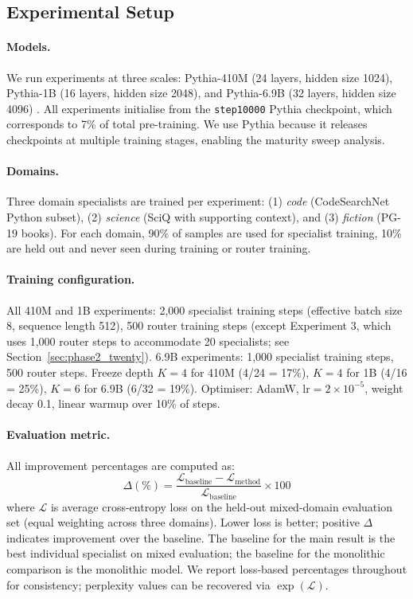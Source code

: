 \documentclass{article}
\begin{document}
\subsection{Experimental Setup}
\label{sec:setup}

\paragraph{Models.} We run experiments at three scales: Pythia-410M (24 layers, hidden size 1024), Pythia-1B (16 layers, hidden size 2048), and Pythia-6.9B (32 layers, hidden size 4096) \citep{biderman2023pythia}. All experiments initialise from the \texttt{step10000} Pythia checkpoint, which corresponds to 7\% of total pre-training. We use Pythia because it releases checkpoints at multiple training stages, enabling the maturity sweep analysis.

\paragraph{Domains.} Three domain specialists are trained per experiment: (1) \emph{code} (CodeSearchNet Python subset), (2) \emph{science} (SciQ with supporting context), and (3) \emph{fiction} (PG-19 books). For each domain, 90\% of samples are used for specialist training, 10\% are held out and never seen during training or router training.

\paragraph{Training configuration.} All 410M and 1B experiments: 2,000 specialist training steps (effective batch size 8, sequence length 512), 500 router training steps (except Experiment 3, which uses 1,000 router steps to accommodate 20 specialists; see Section~\ref{sec:phase2_twenty}). 6.9B experiments: 1,000 specialist training steps, 500 router steps. Freeze depth $K=4$ for 410M (4/24 = 17\%), $K=4$ for 1B (4/16 = 25\%), $K=6$ for 6.9B (6/32 = 19\%). Optimiser: AdamW, $\text{lr}=2\times10^{-5}$, weight decay 0.1, linear warmup over 10\% of steps.

\paragraph{Evaluation metric.} All improvement percentages are computed as:
\[
\Delta(\%) = \frac{\mathcal{L}_\text{baseline} - \mathcal{L}_\text{method}}{\mathcal{L}_\text{baseline}} \times 100
\]
where $\mathcal{L}$ is average cross-entropy loss on the held-out mixed-domain evaluation set (equal weighting across three domains). Lower loss is better; positive $\Delta$ indicates improvement over the baseline. The baseline for the main result is the best individual specialist on mixed evaluation; the baseline for the monolithic comparison is the monolithic model. We report loss-based percentages throughout for consistency; perplexity values can be recovered via $\exp(\mathcal{L})$.
\end{document}
